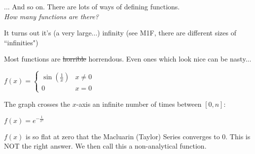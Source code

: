 \documentclass[twoside]{scrartcl}
\begin{document}
... And so on. There are lots of ways of defining functions.\\

\emph{How many functions are there?}

It turns out it's (a very large...) infinity (see M1F, there are different sizes of ``infinities")

Most functions are \sout{horrible} horrendous.
Even ones which look nice can be nasty...\\



\begin{example} $f(x) = \begin{cases}
 \sin(\frac{1}{x}) & x \neq 0\\
 0 & x = 0
 \end{cases}$\\
 
 \end{example}

The graph crosses the $x$-axis an infinite number of times between $[0,n]$:

\begin{center}
\end{center}

\begin{example} $f(x) = e^{-\frac{1}{x^2}}$


\begin{center}
\end{center}

$f(x)$ is so flat at zero that the Macluarin (Taylor) Series converges to 0. This is NOT the right answer. We then call this a non-analytical function.
\end{example}\vspace*{5pt}
\end{document}
